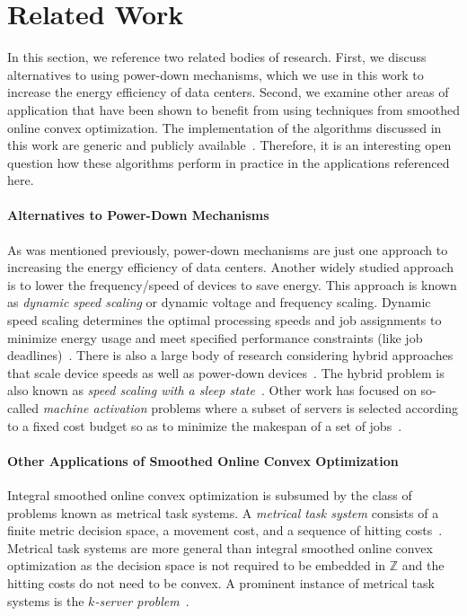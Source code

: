 \section{Related Work}\label{section:introduction:related_work}

In this section, we reference two related bodies of research. First, we discuss alternatives to using power-down mechanisms, which we use in this work to increase the energy efficiency of data centers. Second, we examine other areas of application that have been shown to benefit from using techniques from smoothed online convex optimization. The implementation of the algorithms discussed in this work are generic and publicly available~\cite{Huebotter2021}. Therefore, it is an interesting open question how these algorithms perform in practice in the applications referenced here.

\paragraph{Alternatives to Power-Down Mechanisms} As was mentioned previously, power-down mechanisms are just one approach to increasing the energy efficiency of data centers. Another widely studied approach is to lower the frequency/speed of devices to save energy. This approach is known as \emph{dynamic speed scaling} or dynamic voltage and frequency scaling. Dynamic speed scaling determines the optimal processing speeds and job assignments to minimize energy usage and meet specified performance constraints (like job deadlines)~\cite{Albers2007, Albers2011, Jin2016}. There is also a large body of research considering hybrid approaches that scale device speeds as well as power-down devices~\cite{Jin2016}. The hybrid problem is also known as \emph{speed scaling with a sleep state}~\cite{Albers2014}. Other work has focused on so-called \emph{machine activation} problems where a subset of servers is selected according to a fixed cost budget so as to minimize the makespan of a set of jobs~\cite{Khuller2009, Li2011}.

\paragraph{Other Applications of Smoothed Online Convex Optimization} Integral smoothed online convex optimization is subsumed by the class of problems known as metrical task systems. A \emph{metrical task system} consists of a finite metric decision space, a movement cost, and a sequence of hitting costs~\cite{Bubeck2018_3}. Metrical task systems are more general than integral smoothed online convex optimization as the decision space is not required to be embedded in $\mathbb{Z}$ and the hitting costs do not need to be convex. A prominent instance of metrical task systems is the \emph{$k$-server problem}~\cite{Bubeck2017}.

